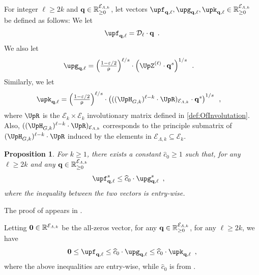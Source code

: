 \documentclass[11pt,reqno]{amsart}
\numberwithin{equation}{section}
\newtheorem{proposition}[theorem]{Proposition}
\newcommand{\cE}{{\mathcal{E}}}
\newcommand{\applegreen}[1]{ {\color{applegreen}#1}}
\newcommand{\bluepigment}[1]{{\color{blue(pigment)}#1}}
\newcommand{\cadmiumgreen}[1]{{\color{cadmiumgreen}#1}}
\newcommand{\darkmagenta}[1]{{\color{darkmagenta}#1}}
\newcommand{\iris}[1]{{\color{iris}#1}}
\newcommand{\ExtV}{\iris{\cE}}
\newcommand{\pfs}{\darkmagenta{s}}
\newcommand{\NBMatrix}{\cadmiumgreen{\UpH}_{G,\kk}}
\newcommand{\Invol}{\UpR}
\renewcommand{\applegreen}[1]{#1}
\renewcommand{\bluepigment}[1]{#1}
\renewcommand{\cadmiumgreen}[1]{#1}
\renewcommand{\darkmagenta}[1]{#1}
\renewcommand{\iris}[1]{#1}
\newcommand{\kk}{\bluepigment{k}}
\newcommand{\kell}{{\color{green(pigment)}\ell}}%
\renewcommand{\kk}{k}
\renewcommand{\kell}{\ell}
\newcommand{\SingBound}{\uprho}
\begin{document}
For integer $\kell\geq 2\kk$ and $\vtest \in \mathbb{R}^{\ExtV_{\Lambda,\kk}}_{\geq 0}$, 
let vectors $\vecF_{\vtest, \kell},\vecG_{\vtest, \kell}, \vecK_{\vtest, \kell} \in \mathbb{R}^{\ExtV_{\Lambda,\kk}}_{\geq 0}$ be 
defined as follows: We let 
% 
\begin{align}\label{eq:DefOfFvec}
\vecF_{\vtest, \kell}=\ExtdInfMatrixL_{\kell}\cdot \vtest \enspace.
\end{align}
% 
We also let 
\begin{align} \label{eq:DefOfGvec}
\vecG_{\vtest, \kell} &= \left( {\textstyle \frac{1-\varepsilon/2}{\SingBound}} \right)^{\kell/\pfs} \cdot 
\left( \TAdj^{(\kell)}\cdot \vtest^{\pfs}\right)^{1/\pfs}
\enspace.
\end{align}
% 
Similarly, we let
\begin{align} \label{eq:DefOfKvec}
\vecK_{\vtest, \kell}&= 
 {\textstyle \left(\frac{1-\varepsilon/2}{\SingBound}\right)^{\kell/\pfs} } \cdot 
% 
\left( ( ( \NBMatrix)^{\kell-\kk}\cdot \Invol)_{\ExtV_{\Lambda,\kk}} \cdot \vtest^{\pfs}\right)^{1/\pfs}
 \enspace,
\end{align}
% 
where $\Invol$ is the $\ExtV_{\kk}\times \ExtV_{\kk}$ involutionary matrix defined in \eqref{def:OfInvolutation}.
Also,  $(( \NBMatrix)^{{\kell-\kk}}\cdot \Invol)_{\ExtV_{\Lambda,\kk}}$ corresponds to the principle submatrix 
of $( \NBMatrix)^{\kell-\kk}\cdot \Invol$ induced by the elements in $\ExtV_{\Lambda, \kk}\subseteq \ExtV_{\kk}$.




\begin{proposition}\label{thrm:HC-VEntryBound}
For $\kk\geq 1$, there exists a constant $\widehat{c}_0\geq 1$ such that, for any $\kell\geq 2\kk$
 and any $\vtest \in \mathbb{R}^{\ExtV_{\Lambda,\kk}}_{\geq 0}$
\begin{align}\label{eq:thrm:HC-VEntryBoundBB}
 \vecF^{\pfs}_{\vtest, \kell} &\leq \widehat{c}_0 \cdot 
% 
\vecG^{\pfs}_{\vtest, \kell} \enspace, 
\end{align}
where the inequality between the two vectors is entry-wise.
\end{proposition}
The proof of  appears in .




%







Letting ${\bf 0}\in \mathbb{R}^{\ExtV_{\Lambda,\kk}}$ be the all-zeros vector, 
for any $\vtest \in \mathbb{R}^{\ExtV_{\Lambda,\kk}}_{\geq 0}$, for any $\kell\geq 2\kk$, we have 
\begin{align}\label{eq:GKVecDom}
{\bf 0}\leq \vecF_{\vtest, \kell} \leq \widehat{c}_0\cdot \vecG_{\vtest, \kell} \leq \widehat{c}_0\cdot \vecK_{\vtest, \kell}\enspace,
\end{align}
where the above inequalities are entry-wise, while $\widehat{c}_0$ is from .
\end{document}
